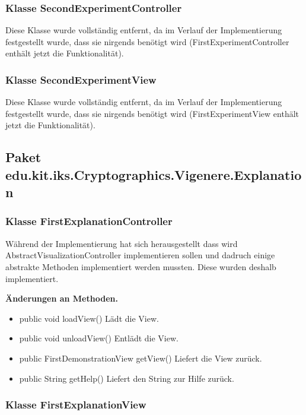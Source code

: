 \documentclass{article}
\begin{document}
    \subsubsection{Klasse SecondExperimentController}
	Diese Klasse wurde vollständig entfernt, da im Verlauf der Implementierung festgestellt wurde,
	dass sie nirgends benötigt wird (FirstExperimentController enthält jetzt die Funktionalität).
	
    \subsubsection{Klasse SecondExperimentView}
	Diese Klasse wurde vollständig entfernt, da im Verlauf der Implementierung festgestellt wurde,
	dass sie nirgends benötigt wird (FirstExperimentView enthält jetzt die Funktionalität).
  \subsection{Paket edu.kit.iks.Cryptographics.Vigenere.Explanation}
    \subsubsection{Klasse FirstExplanationController}
	Während der Implementierung hat sich herausgestellt dass wird AbstractVisualizationController implementieren sollen und dadruch 
	einige abstrakte Methoden implementiert werden mussten. Diese wurden deshalb implementiert.\newline
           
    \textbf{Änderungen an Methoden.}
      \begin{itemize}
		\item public void loadView()\newline
              Lädt die View.
        \item public void unloadView()\newline
              Entlädt die View.
        \item public FirstDemonstrationView getView()\newline
              Liefert die View zurück.
        \item public String getHelp()\newline
              Liefert den String zur Hilfe zurück.
      \end{itemize}
	  
    \subsubsection{Klasse FirstExplanationView}
\end{document}
